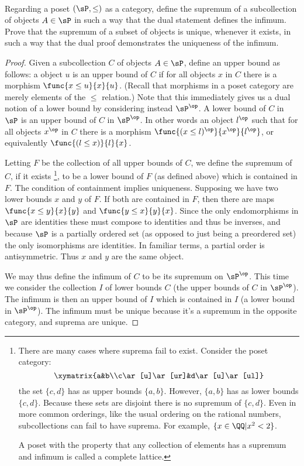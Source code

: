 \documentclass[main.tex]{subfiles}
\begin{document}
\paragraph{}
\begin{exercise}
	Regarding a poset \((\sP,\le)\) as a category, define the supremum of a
	subcollection of objects \(A\in\sP\) in such a way that the dual
	statement defines the infimum. Prove that the supremum of a subset of
	objects is unique, whenever it exists, in such a way that the dual proof
	demonstrates the uniqueness of the infimum.
\end{exercise}
\begin{proof}
	Given a subcollection \(C\) of objects \(A\in\sP\), define an upper bound
	as follows: a object \(u\) is an upper bound of \(C\) if for all objects
	\(x\) in \(C\) there is a morphism \(\func{x\le u}{x}{u}\). (Recall that
	morphisms in a poset category are merely elements of the \(\le\) relation.)
	Note that this immediately gives us a dual notion of a lower bound by
	considering instead \(\sP^\op\). A lower bound of \(C\) in \(\sP\) is an
	upper bound of \(C\) in \(\sP^\op\). In other words an object \(l^\op\) such
	that for all objects \(x^\op\) in \(C\) there is a morphism \(\func{(x\le
	l)^\op}{x^\op}{l^\op}\), or equivalently \(\func{(l\le x)}{l}{x}\).

	Letting \(F\) be the collection of all upper bounds of \(C\), we define the
	supremum of \(C\), if it exists%
	\footnote{There are many cases where suprema fail to exist. Consider
		the poset category: \[\xymatrix{a&b\\c\ar[u]\ar[ur]&d\ar[u]\ar[ul]}\]
		the set \(\{c,d\}\) has as upper bounds \(\{a,b\}\). However,
		\(\{a,b\}\) has as lower bounds \(\{c,d\}\). Because these sets are
		disjoint there is no supremum of \(\{c,d\}\). Even in more common
		orderings, like the usual ordering on the rational numbers,
		subcollections can fail to have suprema. For example,
		\(\{x\in\QQ|x^2<2\}\).

		A poset with the property that any collection of elements has a supremum
		and infimum is called a complete lattice.
	}, to be a lower bound of \(F\) (as defined
	above) which is contained in \(F\). The condition of containment implies
	uniqueness. Supposing we have two lower bounds \(x\) and \(y\) of \(F\). If
	both are contained in \(F\), then there are maps \(\func{x\le y}{x}{y}\) and
	\(\func{y\le x}{y}{x}\). Since the only endomorphisms in \(\sP\) are
	identities these must compose to identities and thus be inverses, and
	because \(\sP\) is a partially ordered set (as opposed to just being a
	preordered set) the only isomorphisms are identities. In familiar terms, a
	partial order is antisymmetric. Thus \(x\) and \(y\) are the same object.

	We may thus define the infimum of \(C\) to be its supremum on \(\sP^\op\).
	This time we consider the collection \(I\) of lower bounds \(C\) (the upper
	bounds of \(C\) in \(\sP^\op\)). The infimum is then an upper bound of \(I\)
	which is contained in \(I\) (a lower bound in \(\sP^\op\)). The infimum must
	be unique because it's a supremum in the opposite category, and suprema are
	unique.
\end{proof}
\end{document}
